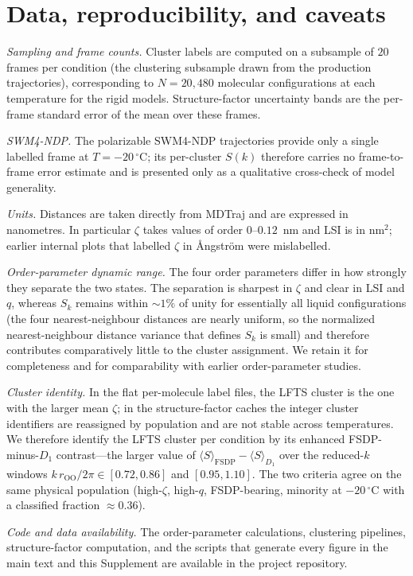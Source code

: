 \documentclass[aps,amsmath,amssymb,onecolumn,superscriptaddress,nofootinbib]{revtex4-2}
\begin{document}
\section{Data, reproducibility, and caveats}
\label{sn:data}

\emph{Sampling and frame counts.}
Cluster labels are computed on a subsample of $20$ frames per condition (the
clustering subsample drawn from the production trajectories), corresponding to
$N=20{,}480$ molecular configurations at each temperature for the rigid models.
Structure-factor uncertainty bands are the per-frame standard error of the mean
over these frames.

\emph{SWM4-NDP.}
The polarizable SWM4-NDP trajectories provide only a single labelled frame at
$T=-20\,^{\circ}$C; its per-cluster $S(k)$ therefore carries no frame-to-frame
error estimate and is presented only as a qualitative cross-check of model
generality.

\emph{Units.}
Distances are taken directly from MDTraj and are expressed in nanometres. In
particular $\zeta$ takes values of order $0$--$0.12$~nm and LSI is in nm$^2$;
earlier internal plots that labelled $\zeta$ in {\AA}ngstr\"om were mislabelled.

\emph{Order-parameter dynamic range.}
The four order parameters differ in how strongly they separate the two states.
The separation is sharpest in $\zeta$ and clear in LSI and $q$, whereas $S_k$
remains within $\sim\!1\%$ of unity for essentially all liquid configurations
(the four nearest-neighbour distances are nearly uniform, so the normalized
nearest-neighbour distance variance that defines $S_k$ is small) and therefore
contributes comparatively little to the cluster assignment. We retain it for completeness and for
comparability with earlier order-parameter studies.

\emph{Cluster identity.}
In the flat per-molecule label files, the LFTS cluster is the one with the
larger mean $\zeta$; in the structure-factor caches the integer cluster
identifiers are reassigned by population and are not stable across temperatures.
We therefore identify the LFTS cluster per condition by its enhanced
FSDP-minus-$D_1$ contrast---the larger value of
$\langle S\rangle_{\mathrm{FSDP}} - \langle S\rangle_{D_1}$ over the reduced-$k$
windows $k\,r_{\mathrm{OO}}/2\pi\in[0.72,0.86]$ and $[0.95,1.10]$. The two
criteria agree on the same physical population (high-$\zeta$, high-$q$,
FSDP-bearing, minority at $-20\,^{\circ}$C with a classified fraction
$\approx 0.36$).

\emph{Code and data availability.}
The order-parameter calculations, clustering pipelines, structure-factor
computation, and the scripts that generate every figure in the main text and
this Supplement are available in the project repository.

\FloatBarrier
\end{document}
